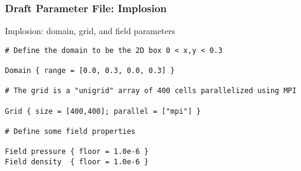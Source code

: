     \begin{frame}[fragile] \frametitle{Draft Parameter File: Implosion}
 \footnotesize
\begin{block}{Implosion: domain, grid, and field parameters}
\begin{verbatim}
# Define the domain to be the 2D box 0 < x,y < 0.3

Domain { range = [0.0, 0.3, 0.0, 0.3] } 
                                
# The grid is a "unigrid" array of 400 cells parallelized using MPI
 
Grid { size = [400,400]; parallel = ["mpi"] }

# Define some field properties
                                
Field pressure { floor = 1.0e-6 }
Field density  { floor = 1.0e-6 }
\end{verbatim}
\end{block}
\end{frame}
